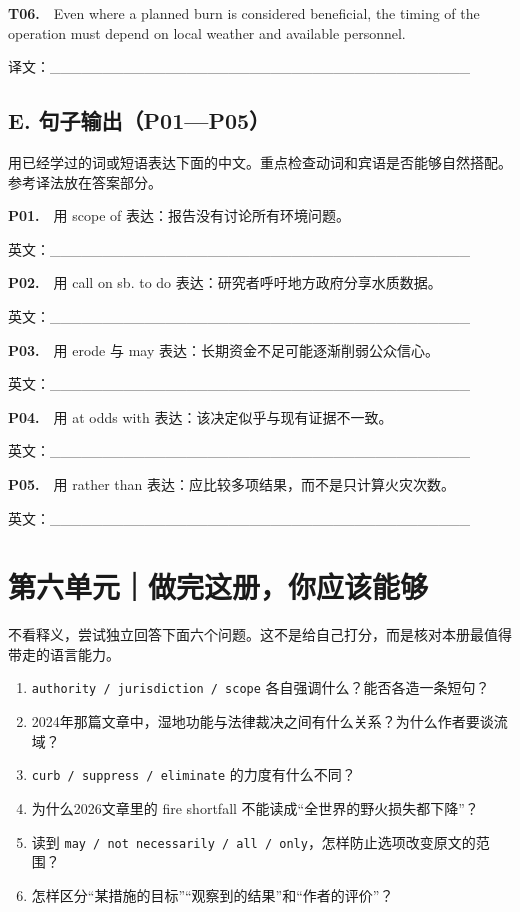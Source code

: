 \documentclass[a4paper,11pt,openany]{report}
\providecommand{\tightlist}{\setlength{\itemsep}{1pt}\setlength{\parskip}{0pt}}
\begin{document}
\textbf{T06.}　Even where a planned burn is considered beneficial, the timing of the operation must depend on local weather and available personnel.

译文：\_\_\_\_\_\_\_\_\_\_\_\_\_\_\_\_\_\_\_\_\_\_\_\_\_\_\_\_\_\_\_\_\_\_\_\_\_\_\_\_

\section{E. 句子输出（P01---P05）}\label{e.-ux53e5ux5b50ux8f93ux51fap01p05}

用已经学过的词或短语表达下面的中文。重点检查动词和宾语是否能够自然搭配。参考译法放在答案部分。

\textbf{P01.}　用 scope of 表达：报告没有讨论所有环境问题。

英文：\_\_\_\_\_\_\_\_\_\_\_\_\_\_\_\_\_\_\_\_\_\_\_\_\_\_\_\_\_\_\_\_\_\_\_\_\_\_\_\_

\textbf{P02.}　用 call on sb. to do 表达：研究者呼吁地方政府分享水质数据。

英文：\_\_\_\_\_\_\_\_\_\_\_\_\_\_\_\_\_\_\_\_\_\_\_\_\_\_\_\_\_\_\_\_\_\_\_\_\_\_\_\_

\textbf{P03.}　用 erode 与 may 表达：长期资金不足可能逐渐削弱公众信心。

英文：\_\_\_\_\_\_\_\_\_\_\_\_\_\_\_\_\_\_\_\_\_\_\_\_\_\_\_\_\_\_\_\_\_\_\_\_\_\_\_\_

\textbf{P04.}　用 at odds with 表达：该决定似乎与现有证据不一致。

英文：\_\_\_\_\_\_\_\_\_\_\_\_\_\_\_\_\_\_\_\_\_\_\_\_\_\_\_\_\_\_\_\_\_\_\_\_\_\_\_\_

\textbf{P05.}　用 rather than 表达：应比较多项结果，而不是只计算火灾次数。

英文：\_\_\_\_\_\_\_\_\_\_\_\_\_\_\_\_\_\_\_\_\_\_\_\_\_\_\_\_\_\_\_\_\_\_\_\_\_\_\_\_

\chapter{第六单元｜做完这册，你应该能够}\label{ux7b2cux516dux5355ux5143ux505aux5b8cux8fd9ux518cux4f60ux5e94ux8be5ux80fdux591f}

不看释义，尝试独立回答下面六个问题。这不是给自己打分，而是核对本册最值得带走的语言能力。

\begin{enumerate}
\def\labelenumi{\arabic{enumi}.}
\tightlist
\item
  \texttt{authority\ /\ jurisdiction\ /\ scope} 各自强调什么？能否各造一条短句？
\item
  2024年那篇文章中，湿地功能与法律裁决之间有什么关系？为什么作者要谈流域？
\item
  \texttt{curb\ /\ suppress\ /\ eliminate} 的力度有什么不同？
\item
  为什么2026文章里的 fire shortfall 不能读成``全世界的野火损失都下降''？
\item
  读到 \texttt{may\ /\ not\ necessarily\ /\ all\ /\ only}，怎样防止选项改变原文的范围？
\item
  怎样区分``某措施的目标''``观察到的结果''和``作者的评价''？
\end{enumerate}
\end{document}
